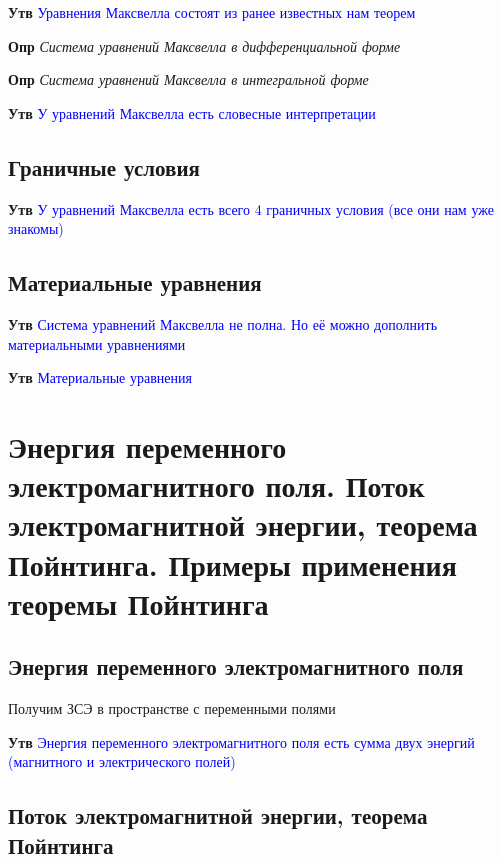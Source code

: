 \documentclass[a4paper, 14pt]{article}
\begin{document}
    \textbf{Утв} \textcolor{blue}{Уравнения Максвелла состоят из ранее известных нам теорем}
    
    \textbf{Опр} \textit{Система уравнений Максвелла в дифференциальной форме}
    
    \textbf{Опр} \textit{Система уравнений Максвелла в интегральной форме}
    
    \textbf{Утв} \textcolor{blue}{У уравнений Максвелла есть словесные интерпретации}
    
    \subsection{Граничные условия}
    
    \textbf{Утв} \textcolor{blue}{У уравнений Максвелла есть всего 4 граничных условия (все они нам уже знакомы)}
    
    \subsection{Материальные уравнения}
    
    \textbf{Утв} \textcolor{blue}{Система уравнений Максвелла не полна.
    Но её можно дополнить материальными уравнениями}
    
    \textbf{Утв} \textcolor{blue}{Материальные уравнения}
    
    \section{Энергия переменного электромагнитного поля.
    Поток электромагнитной энергии, теорема Пойнтинга.
    Примеры применения теоремы Пойнтинга}
    
    \subsection{Энергия переменного электромагнитного поля}
    
    Получим ЗСЭ в пространстве с переменными полями
    
    \textbf{Утв} \textcolor{blue}{Энергия переменного электромагнитного поля есть сумма двух энергий (магнитного и
    электрического полей)}
    
    \subsection{Поток электромагнитной энергии, теорема Пойнтинга}
    
\end{document}
